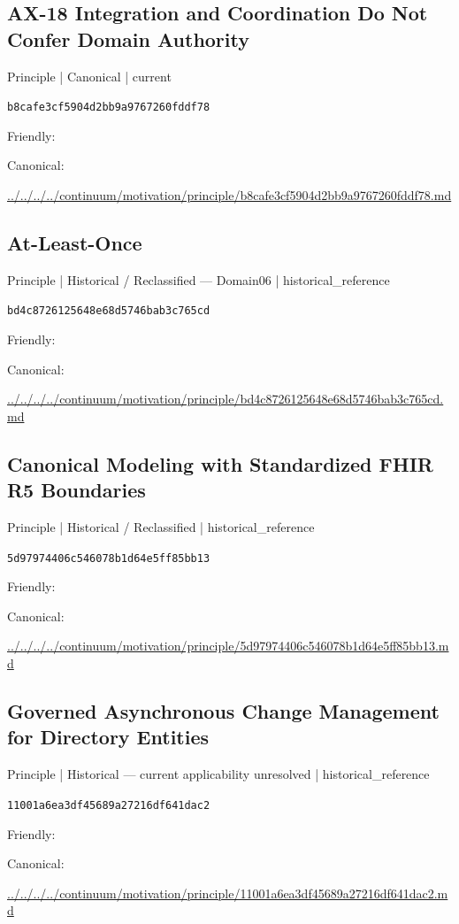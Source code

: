 \documentclass[10pt,a4paper]{article}
\begin{document}
\subsection*{AX-18 Integration and Coordination Do Not Confer Domain Authority}
{\small Principle | Canonical | current}\par
\texttt{b8cafe3cf5904d2bb9a9767260fddf78}\par
Friendly: \par
Canonical: \par
{\footnotesize\url{../../../../continuum/motivation/principle/b8cafe3cf5904d2bb9a9767260fddf78.md}}\par
\subsection*{At-Least-Once}
{\small Principle | Historical / Reclassified — Domain06 | historical\_reference}\par
\texttt{bd4c8726125648e68d5746bab3c765cd}\par
Friendly: \par
Canonical: \par
{\footnotesize\url{../../../../continuum/motivation/principle/bd4c8726125648e68d5746bab3c765cd.md}}\par
\subsection*{Canonical Modeling with Standardized FHIR R5 Boundaries}
{\small Principle | Historical / Reclassified | historical\_reference}\par
\texttt{5d97974406c546078b1d64e5ff85bb13}\par
Friendly: \par
Canonical: \par
{\footnotesize\url{../../../../continuum/motivation/principle/5d97974406c546078b1d64e5ff85bb13.md}}\par
\subsection*{Governed Asynchronous Change Management for Directory Entities}
{\small Principle | Historical — current applicability unresolved | historical\_reference}\par
\texttt{11001a6ea3df45689a27216df641dac2}\par
Friendly: \par
Canonical: \par
{\footnotesize\url{../../../../continuum/motivation/principle/11001a6ea3df45689a27216df641dac2.md}}\par
\end{document}

